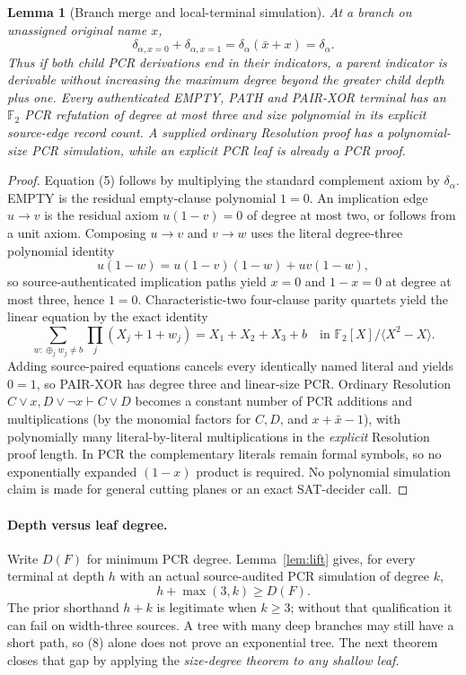 \documentclass[11pt]{article}
\newtheorem{lemma}[theorem]{Lemma}
\begin{document}
\begin{lemma}[Branch merge and local-terminal simulation]\label{lem:merge}
At a branch on unassigned original name $x$,
\[
 \delta_{\alpha,x=0}+\delta_{\alpha,x=1}
 =\delta_\alpha(\bar x+x)=\delta_\alpha.\tag{5}
\]
Thus if both child PCR derivations end in their indicators, a parent indicator is derivable without increasing the maximum degree beyond the greater child depth plus one. Every authenticated EMPTY, PATH and PAIR-XOR terminal has an $\mathbb F_2$ PCR refutation of degree at most three and size polynomial in its \emph{explicit} source-edge record count. A supplied ordinary Resolution proof has a polynomial-size PCR simulation, while an explicit PCR leaf is already a PCR proof.
\end{lemma}
\begin{proof}
Equation (5) follows by multiplying the standard complement axiom by $\delta_\alpha$. EMPTY is the residual empty-clause polynomial $1=0$. An implication edge $u\to v$ is the residual axiom $u(1-v)=0$ of degree at most two, or follows from a unit axiom. Composing $u\to v$ and $v\to w$ uses the literal degree-three polynomial identity
\[
 u(1-w)=u(1-v)(1-w)+uv(1-w),\tag{6}
\]
so source-authenticated implication paths yield $x=0$ and $1-x=0$ at degree at most three, hence $1=0$. Characteristic-two four-clause parity quartets yield the linear equation by the exact identity
\[
 \sum_{w:\oplus_j w_j\ne b}\prod_j(X_j+1+w_j)
 =X_1+X_2+X_3+b\quad\text{in }\mathbb F_2[X]/\langle X^2-X\rangle.\tag{7}
\]
Adding source-paired equations cancels every identically named literal and yields $0=1$, so PAIR-XOR has degree three and linear-size PCR. Ordinary Resolution $C\vee x,D\vee\neg x\vdash C\vee D$ becomes a constant number of PCR additions and multiplications (by the monomial factors for $C,D$, and $x+\bar x-1$), with polynomially many literal-by-literal multiplications in the \emph{explicit} Resolution proof length. In PCR the complementary literals remain formal symbols, so no exponentially expanded $(1-x)$ product is required. No polynomial simulation claim is made for general cutting planes or an exact SAT-decider call.
\end{proof}

\paragraph{Depth versus leaf degree.} Write $D(F)$ for minimum PCR degree. Lemma~\ref{lem:lift} gives, for every terminal at depth $h$ with an actual source-audited PCR simulation of degree $k$,
\[
\boxed{h+\max(3,k)\ge D(F).}\tag{8}
\]
The prior shorthand $h+k$ is legitimate when $k\ge3$; without that qualification it can fail on width-three sources. A tree with many deep branches may still have a short path, so (8) alone does not prove an exponential tree. The next theorem closes that gap by applying the \emph{size-degree theorem to any shallow leaf}.
\end{document}

